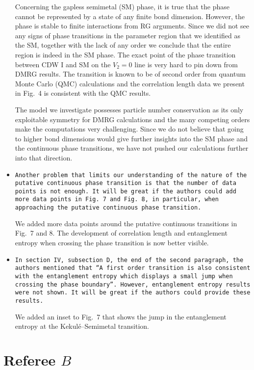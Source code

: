 \documentclass[aps,prb,superscriptaddress]{revtex4}
\begin{document}
\begin{itemize}
Concerning the gapless semimetal (SM) phase, it is true that the phase cannot be represented by a state of any finite bond dimension. However, the phase is stable to finite interactions from RG arguments. Since we did not see any signs of phase transitions in the parameter region that we identified as the SM, together with the lack of any order we conclude that the entire region is indeed in the SM phase. The exact point of the phase transition between CDW I and SM on the $V_2=0$ line is very hard to pin down from DMRG results. The transition is known to be of second order from quantum Monte Carlo (QMC) calculations and the correlation length data we present in Fig.~4 is consistent with the QMC results.

The model we investigate possesses particle number conservation as its only exploitable symmetry for DMRG calculations and the many competing orders make the computations very challenging. Since we do not believe that going to higher bond dimensions would give further insights into the SM phase and the continuous phase transitions, we have not pushed our calculations further into that direction.

\item{\tt Another problem that limits our understanding of the nature of the
putative continuous phase transition is that the number of data points
is not enough. It will be great if the authors could add more data
points in Fig. 7 and Fig. 8, in particular, when approaching the
putative continuous phase transition.}

We added more data points around the putative continuous transitions in Fig.~7 and 8. The development of correlation length and entanglement entropy when crossing the phase transition is now better visible. 

\item{\tt In section IV, subsection D, the end of the second paragraph, the
authors mentioned that “A first order transition is also consistent
with the entanglement entropy which displays a small jump when
crossing the phase boundary”. However, entanglement entropy results
were not shown. It will be great if the authors could provide these
results.}

We added an inset to Fig.~7 that shows the jump in the entanglement entropy at the Kekul\'e--Semimetal transition.




\end{itemize}

\section*{Referee $B$}
\end{document}
